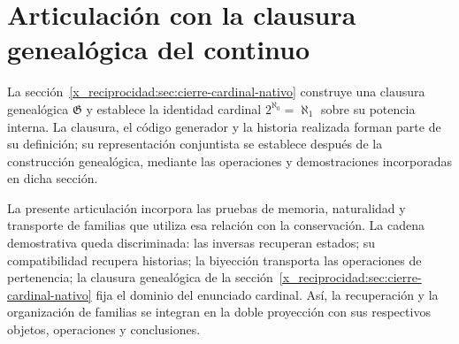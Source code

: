 \section{Articulación con la clausura genealógica del continuo}
La sección~\ref{x_reciprocidad:sec:cierre-cardinal-nativo} construye una clausura
genealógica \(\mathfrak G\) y establece la identidad cardinal
\(2^{\aleph_0}=\aleph_1\) sobre su potencia interna. La clausura,
el código generador y la historia realizada forman parte de su
definición; su representación conjuntista se establece después de la
construcción genealógica, mediante las operaciones y demostraciones
incorporadas en dicha sección.

La presente articulación incorpora las pruebas de memoria,
naturalidad y transporte de familias que utiliza esa relación con
la conservación. La cadena demostrativa queda discriminada:
las inversas recuperan estados; su compatibilidad recupera
historias; la biyección transporta las operaciones de pertenencia;
la clausura genealógica de la sección~\ref{x_reciprocidad:sec:cierre-cardinal-nativo} fija el dominio
del enunciado cardinal. Así, la recuperación y la organización
de familias se integran en la doble proyección con sus respectivos
objetos, operaciones y conclusiones.
